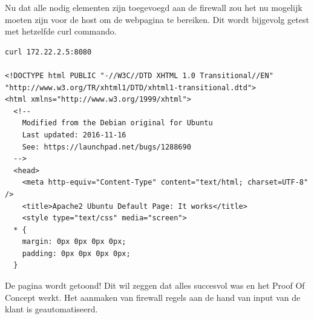 Nu dat alle nodig elementen zijn toegevoegd aan de firewall zou het nu mogelijk moeten zijn voor de host om de webpagina te bereiken. Dit wordt bijgevolg getest met hetzelfde curl commando. 

\begin{lstlisting}[caption={curl werkt}]
curl 172.22.2.5:8080

<!DOCTYPE html PUBLIC "-//W3C//DTD XHTML 1.0 Transitional//EN" "http://www.w3.org/TR/xhtml1/DTD/xhtml1-transitional.dtd">
<html xmlns="http://www.w3.org/1999/xhtml">
  <!--
    Modified from the Debian original for Ubuntu
    Last updated: 2016-11-16
    See: https://launchpad.net/bugs/1288690
  -->
  <head>
    <meta http-equiv="Content-Type" content="text/html; charset=UTF-8" />
    <title>Apache2 Ubuntu Default Page: It works</title>
    <style type="text/css" media="screen">
  * {
    margin: 0px 0px 0px 0px;
    padding: 0px 0px 0px 0px;
  }
\end{lstlisting}

De pagina wordt getoond! Dit wil zeggen dat alles succesvol was en het Proof Of Concept werkt. Het aanmaken van firewall regels aan de hand van input van de klant is geautomatiseerd. 